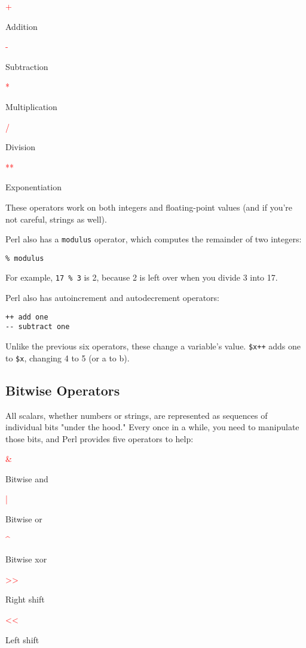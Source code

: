 \textcolor{red}{+}
\begin{adjustwidth}{2em}{}
Addition
\end{adjustwidth}
\textcolor{red}{-}
\begin{adjustwidth}{2em}{}
Subtraction
\end{adjustwidth}
\textcolor{red}{*}
\begin{adjustwidth}{2em}{}
Multiplication
\end{adjustwidth}
\textcolor{red}{/}
\begin{adjustwidth}{2em}{}
Division
\end{adjustwidth}
\textcolor{red}{**}
\begin{adjustwidth}{2em}{}
Exponentiation
\end{adjustwidth}

These operators work on both integers and floating-point values (and if you're not careful, strings as well).

Perl also has a \verb|modulus| operator, which computes the remainder of two integers:

\begin{lstlisting}
% modulus
\end{lstlisting}

For example, \verb|17 % 3| is 2, because 2 is left over when you divide 3 into 17.

Perl also has autoincrement and autodecrement operators:

\begin{lstlisting}
++ add one
-- subtract one
\end{lstlisting}

Unlike the previous six operators, these change a variable's value. \verb|$x++| adds one to \verb|$x|, changing 4 to 5 (or a to b). 

\subsection{Bitwise Operators}
All scalars, whether numbers or strings, are represented as sequences of individual bits "under the hood." Every once in a while, you need to manipulate those bits, and Perl provides five operators to help:

\textcolor{red}{\&}
\begin{adjustwidth}{2em}{}
Bitwise and
\end{adjustwidth}
\textcolor{red}{|}
\begin{adjustwidth}{2em}{}
Bitwise or
\end{adjustwidth}
\textcolor{red}{\^{}}
\begin{adjustwidth}{2em}{}
Bitwise xor
\end{adjustwidth}
\textcolor{red}{\textgreater\textgreater}
\begin{adjustwidth}{2em}{}
Right shift
\end{adjustwidth}
\textcolor{red}{\textless\textless}
\begin{adjustwidth}{2em}{}
Left shift
\end{adjustwidth}

